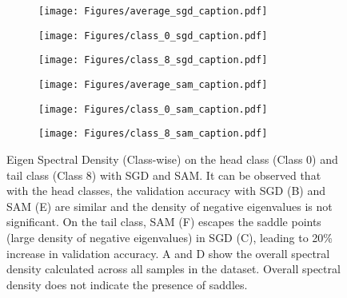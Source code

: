 \documentclass{article}
\begin{document}
\begin{figure}[t]
\begin{subfigure}{.33\textwidth}
  \centering
  \texttt{[image: Figures/average\_sgd\_caption.pdf]}  

  \label{fig:sub-first2}
\end{subfigure}
\begin{subfigure}{.33\textwidth}
  \centering
  \texttt{[image: Figures/class\_0\_sgd\_caption.pdf]}  

  \label{fig:sub-second1}
\end{subfigure}
\begin{subfigure}{.33\textwidth}
  \centering
  \texttt{[image: Figures/class\_8\_sgd\_caption.pdf]}  

  \label{fig:sub-second2}
\end{subfigure}
\newline

\begin{subfigure}{.33\textwidth}
  \centering
  \texttt{[image: Figures/average\_sam\_caption.pdf]}  

  \label{fig:sub-third1}
\end{subfigure}
\begin{subfigure}{.33\textwidth}
  \centering
  \texttt{[image: Figures/class\_0\_sam\_caption.pdf]}  

  \label{fig:sub-fourth3}
\end{subfigure}
\begin{subfigure}{.33\textwidth}
  \centering
  \texttt{[image: Figures/class\_8\_sam\_caption.pdf]}  

  \label{fig:sub-second3}
\end{subfigure}
\caption{Eigen Spectral Density (Class-wise) on the head class (Class 0) and tail class (Class 8) with SGD and SAM. It can be observed that with the head classes, the validation accuracy with SGD (B) and SAM (E) are similar and the density of negative eigenvalues is not significant. On the tail class, SAM (F) escapes the saddle points (large density of negative eigenvalues) in SGD (C), leading to 20\% increase in validation accuracy. A and D show the overall spectral density calculated across all samples in the dataset. Overall spectral density does not indicate the presence of saddles.}
\label{fig:head-tail-esd}
\vspace{-1em}
\end{figure}
\end{document}
